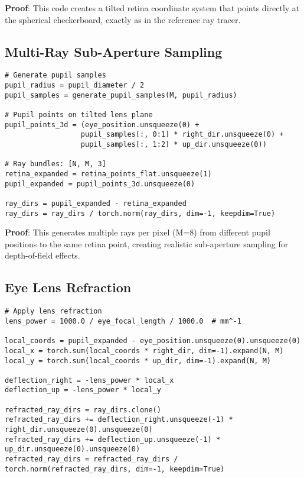 \documentclass[11pt]{article}
\begin{document}
\textbf{Proof}: This code creates a tilted retina coordinate system that points directly at the spherical checkerboard, exactly as in the reference ray tracer.

\subsection{Multi-Ray Sub-Aperture Sampling}

\begin{lstlisting}[caption={Multi-ray sampling implementation}]
# Generate pupil samples
pupil_radius = pupil_diameter / 2
pupil_samples = generate_pupil_samples(M, pupil_radius)

# Pupil points on tilted lens plane
pupil_points_3d = (eye_position.unsqueeze(0) + 
                  pupil_samples[:, 0:1] * right_dir.unsqueeze(0) +
                  pupil_samples[:, 1:2] * up_dir.unsqueeze(0))

# Ray bundles: [N, M, 3]
retina_expanded = retina_points_flat.unsqueeze(1)
pupil_expanded = pupil_points_3d.unsqueeze(0)

ray_dirs = pupil_expanded - retina_expanded
ray_dirs = ray_dirs / torch.norm(ray_dirs, dim=-1, keepdim=True)
\end{lstlisting}

\textbf{Proof}: This generates multiple rays per pixel (M=8) from different pupil positions to the same retina point, creating realistic sub-aperture sampling for depth-of-field effects.

\subsection{Eye Lens Refraction}

\begin{lstlisting}[caption={Eye lens optical refraction}]
# Apply lens refraction
lens_power = 1000.0 / eye_focal_length / 1000.0  # mm^-1

local_coords = pupil_expanded - eye_position.unsqueeze(0).unsqueeze(0)
local_x = torch.sum(local_coords * right_dir, dim=-1).expand(N, M)
local_y = torch.sum(local_coords * up_dir, dim=-1).expand(N, M)

deflection_right = -lens_power * local_x
deflection_up = -lens_power * local_y

refracted_ray_dirs = ray_dirs.clone()
refracted_ray_dirs += deflection_right.unsqueeze(-1) * right_dir.unsqueeze(0).unsqueeze(0)
refracted_ray_dirs += deflection_up.unsqueeze(-1) * up_dir.unsqueeze(0).unsqueeze(0)
refracted_ray_dirs = refracted_ray_dirs / torch.norm(refracted_ray_dirs, dim=-1, keepdim=True)
\end{lstlisting}
\end{document}
